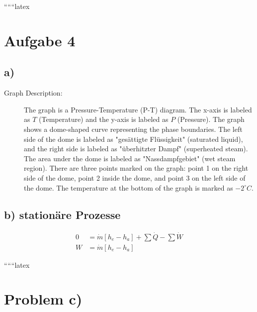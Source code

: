 
``````latex


\section*{Aufgabe 4}

\subsection*{a)}

\begin{description}
    \item[Graph Description:] The graph is a Pressure-Temperature (P-T) diagram. The x-axis is labeled as $T$ (Temperature) and the y-axis is labeled as $P$ (Pressure). The graph shows a dome-shaped curve representing the phase boundaries. The left side of the dome is labeled as "gesättigte Flüssigkeit" (saturated liquid), and the right side is labeled as "überhitzter Dampf" (superheated steam). The area under the dome is labeled as "Nassdampfgebiet" (wet steam region). There are three points marked on the graph: point 1 on the right side of the dome, point 2 inside the dome, and point 3 on the left side of the dome. The temperature at the bottom of the graph is marked as $-2^\circ C$.
\end{description}

\subsection*{b) stationäre Prozesse}

\begin{align*}
0 &= \dot{m} \left[ h_e - h_a \right] + \sum \dot{Q} - \sum \dot{W} \\
W &= \dot{m} \left[ h_e - h_a \right]
\end{align*}

``````latex


\section*{Problem c)}

